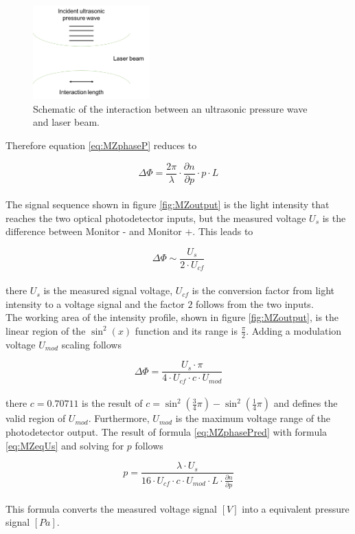 \begin{figure}[H]
	\centering
	\includegraphics[width = 0.4\textwidth, height=0.2\textheight]{05_OUSD/images/pInteract.png}
	\caption{Schematic of the interaction between an ultrasonic pressure wave and laser beam.}
	\label{fig:pInteract}
\end{figure} 

Therefore equation \ref{eq:MZphaseP} reduces to 

\begin{equation}
\Delta\Phi = \frac{2\pi}{\lambda} \cdot \frac{\partial n}{\partial p} \cdot p \cdot L
\label{eq:MZphasePred}
\end{equation}
\\

The signal sequence shown in figure \ref{fig:MZoutput} is the light intensity that reaches the two optical photodetector inputs, but the measured voltage $U_s$ is the difference between Monitor - and Monitor +. This leads to 

\begin{equation}
\Delta\Phi \sim \frac{U_s}{2\cdot U_{cf}} 
\label{eq:MZpropUs}
\end{equation}
\\

there $U_s$ is the measured signal voltage, $U_{cf}$ is the conversion factor from light intensity to a voltage signal and the factor $2$ follows from the two inputs. \\
The working area of the intensity profile, shown in figure \ref{fig:MZoutput}, is the linear region of the $\sin^2(x)$ function and its range is $\frac{\pi}{2}$. Adding a modulation voltage $U_{mod}$ scaling follows

\begin{equation}
\Delta\Phi = \frac{U_s \cdot \pi}{4 \cdot U_{cf} \cdot c \cdot U_{mod}} 
\label{eq:MZeqUs}
\end{equation}
\\

there $c = 0.70711$ is the result of $c = \sin^2(\frac{3}{4}\pi) - \sin^2(\frac{1}{4}\pi)$ and defines the valid region of $U_{mod}$. Furthermore, $U_{mod}$ is the maximum voltage range of the photodetector output. The result of formula \ref{eq:MZphasePred} with formula \ref{eq:MZeqUs} and solving for $p$ follows

\begin{equation}
p = \frac{\lambda \cdot U_s}{16 \cdot U_{cf} \cdot c \cdot U_{mod} \cdot L \cdot \frac{\partial n}{\partial p}} 
\label{eq:MZp}
\end{equation}
\\

This formula converts the measured voltage signal $[V]$ into a equivalent pressure signal $[Pa]$. 







